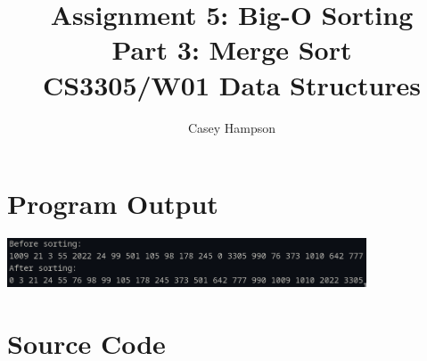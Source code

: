 \documentclass{article}
\title{Assignment 5: Big-O Sorting \\[5pt] Part 3: Merge Sort \\[8pt] CS3305/W01 Data Structures}
\author{Casey Hampson}
\begin{document}
\maketitle


\section*{Program Output}
\begin{center}
\includegraphics[width=0.8\textwidth]{./res/1.png}
\end{center}


\pagebreak
\section*{Source Code}
\inputminted{java}{./P3.java}
\end{document}
